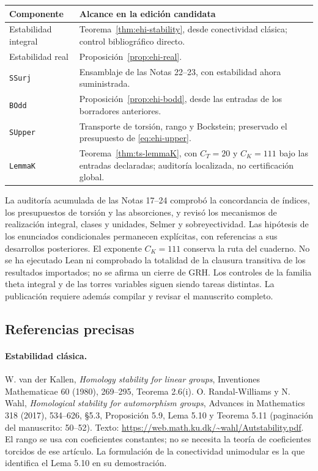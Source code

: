 \begin{center}\small
\begin{tabularx}{\textwidth}{@{}p{}Y@{}}
\toprule
Componente & Alcance en la edición candidata\\\midrule
Estabilidad integral & Teorema~\ref{thm:ehi-stability}, desde conectividad clásica; control bibliográfico directo.\\
Estabilidad real & Proposición~\ref{prop:ehi-real}.\\
\texttt{SSurj} & Ensamblaje de las Notas 22--23, con estabilidad ahora suministrada.\\
\texttt{BOdd} & Proposición~\ref{prop:ehi-bodd}, desde las entradas de los borradores anteriores.\\
\texttt{SUpper} & Transporte de torsión, rango y Bockstein; preservado el presupuesto de \eqref{eq:ehi-upper}.\\
\texttt{LemmaK} & Teorema~\ref{thm:ts-lemmaK}, con $C_T=20$ y $C_K=111$ bajo las entradas declaradas; auditoría localizada, no certificación global.\\\bottomrule
\end{tabularx}
\end{center}

La auditoría acumulada de las Notas 17--24 comprobó la concordancia de índices, los presupuestos de torsión y las absorciones, y revisó los mecanismos de realización integral, clases y unidades, Selmer y sobreyectividad. Las hipótesis de los enunciados condicionales permanecen explícitas, con referencias a sus desarrollos posteriores. El exponente $C_K=111$ conserva la ruta del cuaderno. No se ha ejecutado Lean ni comprobado la totalidad de la clausura transitiva de los resultados importados; no se afirma un cierre de GRH. Los controles de la familia theta integral y de las torres variables siguen siendo tareas distintas. La publicación requiere además compilar y revisar el manuscrito completo.

\subsection{Referencias precisas}

\paragraph{Estabilidad clásica.} W. van der Kallen, \emph{Homology stability for linear groups}, Inventiones Mathematicae 60 (1980), 269--295, Teorema 2.6(i). O. Randal-Williams y N. Wahl, \emph{Homological stability for automorphism groups}, Advances in Mathematics 318 (2017), 534--626, §5.3, Proposición 5.9, Lema 5.10 y Teorema 5.11 (paginación del manuscrito: 50--52). Texto: \url{https://web.math.ku.dk/~wahl/Autstability.pdf}. El rango se usa con coeficientes constantes; no se necesita la teoría de coeficientes torcidos de ese artículo. La formulación de la conectividad unimodular es la que identifica el Lema 5.10 en su demostración.

